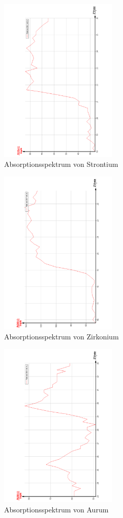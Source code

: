 \begin{figure}
  \centering
  \includegraphics[width=0.5\textwidth, angle=270]{bilder/AbsorpSr.pdf}
  \caption{Absorptionsspektrum von Strontium}
  \label{fig:Strontium}
\end{figure}

\begin{figure}
  \centering
  \includegraphics[width=0.5\textwidth, angle=270]{bilder/AbsorpZr.pdf}
  \caption{Absorptionsspektrum von Zirkonium}
  \label{fig:Zirkonium}
\end{figure}

\begin{figure}
  \centering
  \includegraphics[width=0.5\textwidth, angle=270]{bilder/AbsorpAu.pdf}
  \caption{Absorptionsspektrum von Aurum}
  \label{fig:Aurum}
\end{figure}
